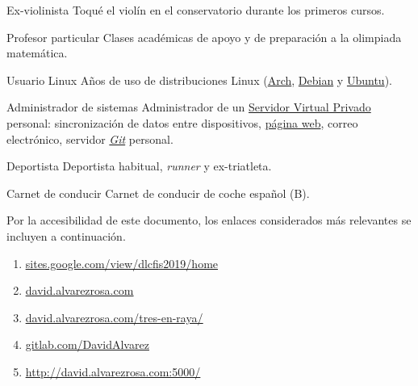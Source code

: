 

\cvachievement{\faMusic}
{Ex-violinista \smallskip}
{\small {}%
  \small{}}
Toqué el violín en el conservatorio durante los primeros cursos.

\divider

\cvachievement{\faGroup}
{Profesor particular \smallskip}
{Clases académicas de apoyo y de preparación a la olimpiada matemática.}

\divider

\cvachievement{\faLinux}
{Usuario Linux \smallskip}
{Años de uso de distribuciones Linux (\href{https://www.archlinux.org/}{Arch},
\href{https://www.debian.org/}{Debian} y \href{https://ubuntu.com/}{Ubuntu}).}

\divider

\cvachievement{\faServer}
{Administrador de sistemas}
{Administrador de un
\href{https://es.wikipedia.org/wiki/Servidor_virtual_privado}{Servidor Virtual
Privado} personal: sincronización de datos entre dispositivos,
\href{https://david.alvarezrosa.com}{página web\footnotemark}, correo
electrónico, servidor \href{https://es.wikipedia.org/wiki/Git}{\textit{Git}}
personal.}

\divider

\cvachievement{\faHeartbeat}
{Deportista \smallskip}
{Deportista habitual, \textit{runner} y ex-triatleta.}

\divider

\cvachievement{\faCar}
{Carnet de conducir \smallskip}
{\small {}%
  \small{}}
Carnet de conducir de coche español (B).


\medskip

Por la accesibilidad de este documento, los enlaces considerados más relevantes
se incluyen a continuación. \\[1.25ex]
\begin{enumerate}
  \item \href{https://sites.google.com/view/dlcfis2019/home}
  {\underline{sites.google.com/view/dlcfis2019/home}}
  \item \href{https://david.alvarezrosa.com}{\underline{david.alvarezrosa.com}}
  \item \href{https://david.alvarezrosa.com/tres-en-raya}
  {\underline{david.alvarezrosa.com/tres-en-raya/}}
  \item \href{https://gitlab.com/david-alvarez-rosa/}
  {\underline{gitlab.com/DavidAlvarez}}
  \item \href{http://david.alvarezrosa.com:5000/}
  {\underline{http://david.alvarezrosa.com:5000/}}
\end{enumerate}
